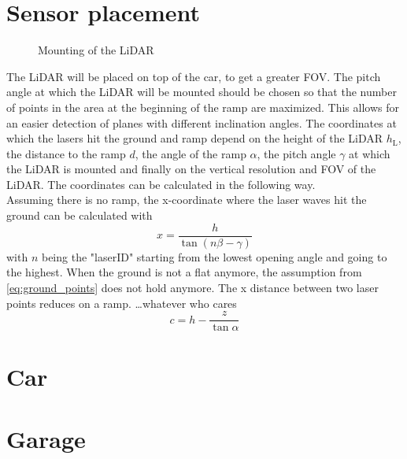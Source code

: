 \section{Sensor placement}
\begin{figure}[htpb]
	\centering
	
	\caption{Mounting of the LiDAR}
	\label{fig:tikz_lidar_mount}
\end{figure}
The LiDAR will be placed on top of the car, to get a greater FOV.
The pitch angle at which the LiDAR will be mounted should be chosen so that the number of points in the area at the beginning of the ramp are maximized.
This allows for an easier detection of planes with different inclination angles.
The coordinates at which the lasers hit the ground and ramp depend on the height of the LiDAR $ h_\mathrm{L} $, the distance to the ramp $d$, the angle of the ramp $\alpha$, the pitch angle $\gamma$ at which the LiDAR is mounted and finally on the vertical resolution and FOV of the LiDAR. The coordinates can be calculated in the following way.\\
Assuming there is no ramp, the x-coordinate where the laser waves hit the ground can be calculated with
\begin{equation}
	x = \frac{h}{\tan(n\beta - \gamma)}
	\label{eq:ground_points}
\end{equation}
with $n$ being the "laserID" starting from the lowest opening angle and going to the highest.
When the ground is not a flat anymore, the assumption from \ref{eq:ground_points} does not hold anymore. The x distance between two laser points reduces on a ramp.
\dots whatever who cares
\[ c = h - \frac{z}{\tan \alpha} \]



\section{Car}



\section{Garage}
